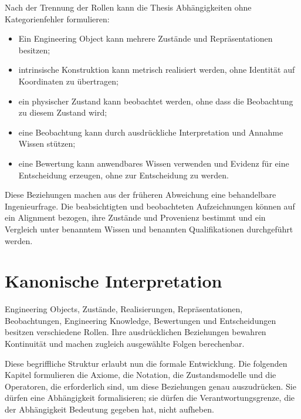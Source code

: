 Nach der Trennung der Rollen kann die Thesis Abhängigkeiten ohne
Kategorienfehler formulieren:

\begin{itemize}
\item Ein Engineering Object kann mehrere Zustände und Repräsentationen
  besitzen;
\item intrinsische Konstruktion kann metrisch realisiert werden, ohne Identität
  auf Koordinaten zu übertragen;
\item ein physischer Zustand kann beobachtet werden, ohne dass die Beobachtung
  zu diesem Zustand wird;
\item eine Beobachtung kann durch ausdrückliche Interpretation und Annahme
  Wissen stützen;
\item eine Bewertung kann anwendbares Wissen verwenden und Evidenz für eine
  Entscheidung erzeugen, ohne zur Entscheidung zu werden.
\end{itemize}

Diese Beziehungen machen aus der früheren Abweichung eine behandelbare
Ingenieurfrage. Die beabsichtigten und beobachteten Aufzeichnungen können auf
ein Alignment bezogen, ihre Zustände und Provenienz bestimmt und ein Vergleich
unter benanntem Wissen und benannten Qualifikationen durchgeführt werden.

\section{Kanonische Interpretation}

\begin{proposition}
Engineering Objects, Zustände, Realisierungen, Repräsentationen,
Beobachtungen, Engineering Knowledge, Bewertungen und Entscheidungen besitzen
verschiedene Rollen. Ihre ausdrücklichen Beziehungen bewahren Kontinuität und
machen zugleich ausgewählte Folgen berechenbar.
\end{proposition}

Diese begriffliche Struktur erlaubt nun die formale Entwicklung. Die folgenden
Kapitel formulieren die Axiome, die Notation, die Zustandsmodelle und die
Operatoren, die erforderlich sind, um diese Beziehungen genau auszudrücken.
Sie dürfen eine Abhängigkeit formalisieren; sie dürfen die
Verantwortungsgrenze, die der Abhängigkeit Bedeutung gegeben hat, nicht
aufheben.
